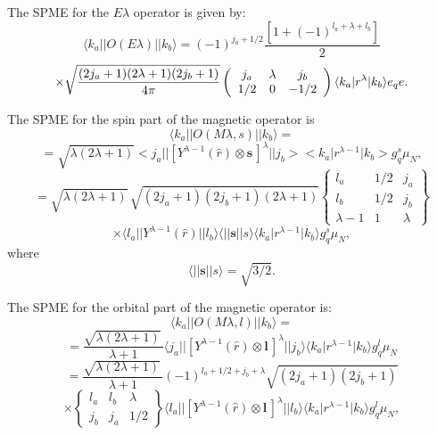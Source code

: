 \documentclass[graybox,sectrefs,envcountresetchap,open=right]{svmonodo}
\begin{document}
The SPME for the $  E\lambda   $ operator is given by:
\[
\langle k_{a}\vert\vert O(E\lambda )\vert\vert k_{b}\rangle=(-1)^{j_{a}+1/2}\frac{[1+(-1)^{l_{a}+\lambda +l_{b}}]}{2}
\]
\[
 \times\sqrt{ {(2j_{a}+1)(2\lambda +1)(2j_{b}+1)\over4\pi }}\left(\begin{array}{ccc}  {j_{a}}&  {\lambda} &  {j_{b}}\\  {1/2} & {0}&  {-1/2}\end{array}\right)\langle k_{a}\vert r^{\lambda }\vert k_{b}\rangle e_{q} e.
\]


The SPME for the spin part of the magnetic operator is
\[
\langle k_{a}\vert\vert O(M\lambda ,s)\vert\vert k_{b}\rangle =
\]
\[
=\sqrt{\lambda (2\lambda +1)}<j_{a}\vert\vert [Y^{\lambda -1}(\hat{r})\otimes\mathbf{s}\,]^{\lambda }\vert\vert j_{b}><k_{a}\vert r^{\lambda -1}\vert k_{b}>g^{s}_{q}\mu _{N},
\]
\[
= \sqrt{\lambda (2\lambda +1)}\, \sqrt{(2j_{a}+1)(2j_{b}+1)(2\lambda +1)}\left\{\begin{array}{ccc}  {l _{a}}&  {1/2} & {j_{a}}\\  {l _{b}}&  {1/2} & {j_{b}}\\  {\lambda -1} & {1} & {\lambda}\end{array}\right\}
\]
\[
\times \langle l _{a}\vert\vert Y^{\lambda -1}(\hat{r})\vert\vert l _{b}\rangle\langle\vert\vert \mathbf{s}\vert\vert s\rangle\langle k_{a}\vert r^{\lambda -1}\vert k_{b}\rangle g^{s}_{q}\mu _{N},
\]
where
\[
\langle\vert\vert \mathbf{s}\vert\vert s\rangle = \sqrt{3/2}.
\]


The SPME for the orbital part of the magnetic operator is:
\[
\langle k_{a}\vert\vert O(M\lambda ,l )\vert\vert k_{b}\rangle=
\]
\[
= \frac{\sqrt{\lambda (2\lambda +1)}\, }{\lambda +1}
\langle j_{a}\vert\vert [Y^{\lambda -1}(\hat{r})\otimes\mathbf{l}\,]^{\lambda }\vert\vert j_{b}\rangle
\langle k_{a}\vert r^{\lambda -1}\vert k_{b}\rangle g^{l }_{q}\mu _{N}
\]
\[
=\frac{\sqrt{\lambda (2\lambda +1)}\, }{\lambda +1}(-1)^{l _{a}+1/2+j_{b}+\lambda } \sqrt{(2j_{a}+1)(2j_{b}+1)}
\]
\[
\times\left\{\begin{array}{ccc}  {l _{a}} &  {l _{b}} & {\lambda} \\  {j_{b}}&  {j_{a}}&  {1/2}\end{array}\right\}
\langle l _{a}\vert\vert [Y^{\lambda -1}(\hat{r})\otimes\mathbf{l}\,]^{\lambda }\vert\vert l _{b}\rangle
\langle k_{a}\vert r^{\lambda -1}\vert k_{b}\rangle g^{l }_{q}\mu _{N}, 
\]
\end{document}
